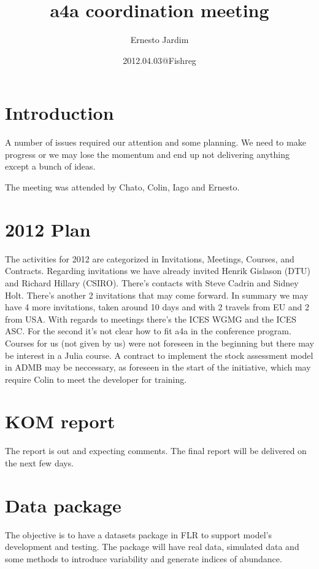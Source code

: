 \documentclass[10pt,a4paper]{article}
\begin{document}
\title{a4a coordination meeting}
\date{2012.04.03@Fishreg}
\author{Ernesto Jardim}
\maketitle
\section{Introduction}
A number of issues required our attention and some planning. We need to make progress or we may lose the momentum and end up not delivering anything except a bunch of ideas.

The meeting was attended by Chato, Colin, Iago and Ernesto.

\section{2012 Plan}
The activities for 2012 are categorized in Invitations, Meetings, Courses, and Contracts. Regarding invitations we have already invited Henrik Gislason (DTU) and Richard Hillary (CSIRO). There's contacts with Steve Cadrin and Sidney Holt. There's another 2 invitations that may come forward. In summary we may have 4 more invitations, taken around 10 days and with 2 travels from EU and 2 from USA. With regards to meetings there's the ICES WGMG and the ICES ASC. For the second it's not clear how to fit a4a in the conference program. Courses for us (not given by us) were not foreseen in the beginning but there may be interest in a Julia course. A contract to implement the stock assessment model in ADMB may be neccessary, as foreseen in the start of the initiative, which may require Colin to meet the developer for training.  

\section{KOM report}
The report is out and expecting comments. The final report will be delivered on the next few days.

\section{Data package}
The objective is to have a datasets package in FLR to support model's development and testing. The package will have real data, simulated data and some methods to introduce variability and generate indices of abundance.
\end{document}
